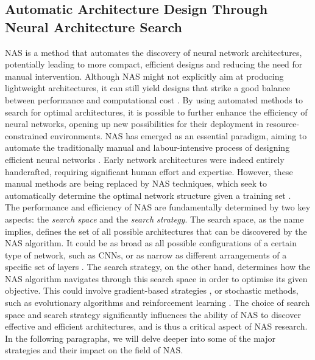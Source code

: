
\subsection{Automatic Architecture Design Through Neural Architecture Search}\label{sec:sota:nas}

\acf{NAS} is a method that automates the discovery of neural network
architectures, potentially leading to more compact, efficient designs and
reducing the need for manual intervention. Although \ac{NAS} might not
explicitly aim at producing lightweight architectures, it can still yield
designs that strike a good balance between performance and computational cost
\cite{DBLP:conf/cvpr/TanCPVSHL19,DBLP:conf/icml/TanL19}. By using automated
methods to search for optimal architectures, it is possible to further enhance
the efficiency of neural networks, opening up new possibilities for their
deployment in resource-constrained environments. \ac{NAS} has emerged as an
essential paradigm, aiming to automate the traditionally manual and
labour-intensive process of designing efficient neural networks
\cite{DBLP:journals/corr/MiikkulainenLMR17}. Early network architectures were
indeed entirely handcrafted, requiring significant human effort and expertise.
However, these manual methods are being replaced by \ac{NAS} techniques, which
seek to automatically determine the optimal network structure given a training
set \cite{DBLP:journals/corr/abs-2301-08727,elsken2019neural}.\\

The performance and efficiency of \ac{NAS} are fundamentally determined by two
key aspects: the \emph{search space} and the \emph{search strategy}. The search
space, as the name implies, defines the set of all possible architectures that
can be discovered by the \ac{NAS} algorithm. It could be as broad as all
possible configurations of a certain type of network, such as \acp{CNN}, or as
narrow as different arrangements of a specific set of layers
\cite{DBLP:conf/cvpr/LiuCSAHY019}. The search strategy, on the other hand,
determines how the \ac{NAS} algorithm navigates through this search space in
order to optimise its given objective. This could involve gradient-based
strategies \cite{DBLP:conf/iclr/LiuSY19,DBLP:conf/iclr/XuX0CQ0X20}, or
stochastic methods, such as evolutionary algorithms and reinforcement learning
\cite{DBLP:conf/iclr/ZophL17,DBLP:conf/icml/RealMSSSTLK17}. The choice of search
space and search strategy significantly influences the ability of \ac{NAS} to
discover effective and efficient architectures, and is thus a critical aspect of
NAS research. In the following paragraphs, we will delve deeper into some of the
major strategies and their impact on the field of \ac{NAS}.\\



